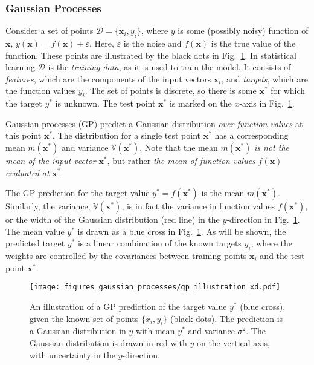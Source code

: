 \documentclass[twoside,english]{uiofysmaster}
\begin{document}
{{\subsubsection{Gaussian Processes}\label{Sec:: gaussian process : Gaussian Processes}

Consider a set of points $\mathcal{D} = \{\textbf{x}_i, y_i\}$, where $y$ is some (possibly noisy) function of $\textbf{x}$, $y(\textbf{x}) = f(\textbf{x}) + \varepsilon$. Here, $\varepsilon$ is the noise and $f(\textbf{x})$ is the true value of the function. These points are illustrated by the black dots in Fig.~\ref{Fig:: gaussian process : GP illustration}. In statistical learning $\mathcal{D}$ is the \textit{training data}, as it is used to train the model. It consists of \textit{features}, which are the components of the input vectors $\textbf{x}_i$, and \textit{targets}, which are the function values $y_i$. The set of points is discrete, so there is some $\textbf{x}^*$ for which the target $y^*$ is unknown. The test point $\textbf{x}^*$ is marked on the $x$-axis in Fig.~\ref{Fig:: gaussian process : GP illustration}.

Gaussian processes (GP) predict a Gaussian distribution \textit{over function values} at this point $\textbf{x}^*$. The distribution for a single test point $\textbf{x}^*$ has a corresponding mean $m(\textbf{x}^*)$ and variance $\mathbb{V}(\textbf{x}^*)$. Note that the mean $m(\textbf{x}^*)$ \textit{is not the mean of the input vector} $\textbf{x}^*$, but rather \textit{the mean of function values} $f(\textbf{x})$ \textit{evaluated at} $\textbf{x}^*$. 

The GP prediction for the target value $y^*=f(\textbf{x}^*)$ is the mean $m(\textbf{x}^*)$. Similarly, the variance, $\mathbb{V}(\textbf{x}^*)$, is in fact the variance in function values $f(\textbf{x}^*)$, or the width of the Gaussian distribution (red line) in the $y$-direction in Fig.~\ref{Fig:: gaussian process : GP illustration}. The mean value $y^*$ is drawn as a blue cross in Fig.~\ref{Fig:: gaussian process : GP illustration}. As will be shown, the predicted target $y^*$ is a linear combination of the known targets $y_i$, where the weights are controlled by the covariances between training points $\textbf{x}_i$ and the test point $\textbf{x}^*$.  


\begin{figure}
\centering
\texttt{[image: figures\_gaussian\_processes/gp\_illustration\_xd.pdf]}
\caption{An illustration of a GP prediction of the target value $y^*$ (blue cross), given the known set of points $\{x_i, y_i\}$ (black dots). The prediction is a Gaussian distribution in $y$ with mean $y^*$ and variance $\sigma^2$. The Gaussian distribution is drawn in red with $y$ on the vertical axis, with uncertainty in the $y$-direction.}
\label{Fig:: gaussian process : GP illustration}
\end{figure}

}}
\end{document}
